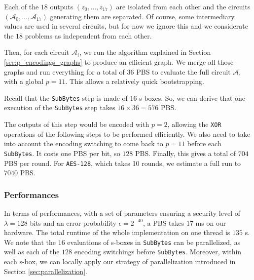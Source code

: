 Each of the $18$ outputs $(z_0, \dots, z_{17})$ are isolated from each other and the circuits $(\mathcal{A}_0, \dots, \mathcal{A}_{17})$ generating them are separated. Of course, some intermediary values are used in several circuits, but for now we ignore this and we considerate the $18$ problems as independent from each other. 

Then, for each circuit $\mathcal{A}_i$, we run the algorithm explained in Section \ref{sec:p_encodings_graphs} to produce an efficient graph. We merge all those graphs and run everything for a total of 36 PBS to evaluate the full circuit $\mathcal{A}$, with a global $p = 11$. This allows a relatively quick bootstrapping.

Recall that the \texttt{SubBytes} step is made of 16 s-boxes. So, we can derive that one execution of the \texttt{SubBytes} step takes $16 \times 36 = 576$ PBS. 

The outputs of this step would be encoded with $p=2$, allowing the \texttt{XOR} operations of the following steps to be performed efficiently. We also need to take into account the encoding switching to come back to $p=11$ before each \texttt{SubBytes}. It costs one PBS per bit, so $128$ PBS. Finally, this gives a total of $704$ PBS per round. For \texttt{AES-128}, which takes 10 rounds, we estimate a full run to $7040$ PBS.

\subsubsection{Performances}

In terms of performances, with a set of parameters ensuring a security level of $\lambda=128$ bits and an error probability $\epsilon=2^{-40}$, a PBS takes $17$ ms on our hardware. The total runtime of the whole implementation on one thread is $135$ s. We note that the $16$ evaluations of s-boxes in \texttt{SubBytes} can be parallelized, as well as each of the $128$ encoding switchings before \texttt{SubBytes}. Moreover, within each s-box, we can locally apply our strategy of parallelization introduced in Section \ref{sec:parallelization}.


